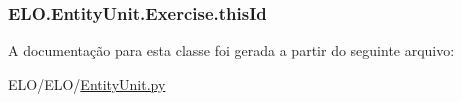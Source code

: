 \hypertarget{classELO_1_1EntityUnit_1_1Exercise_a6277daccaa7fe96d8f0a287002cea07a}{
\subsubsection[{this\-Id}]{\setlength{\rightskip}{0pt plus 5cm}E\-L\-O.\-Entity\-Unit.\-Exercise.\-this\-Id}}\label{d5/d6a/classELO_1_1EntityUnit_1_1Exercise_a6277daccaa7fe96d8f0a287002cea07a}


A documentação para esta classe foi gerada a partir do seguinte arquivo\-:\begin{DoxyCompactItemize}
\item 
E\-L\-O/\-E\-L\-O/\hyperlink{EntityUnit_8py}{Entity\-Unit.\-py}\end{DoxyCompactItemize}
